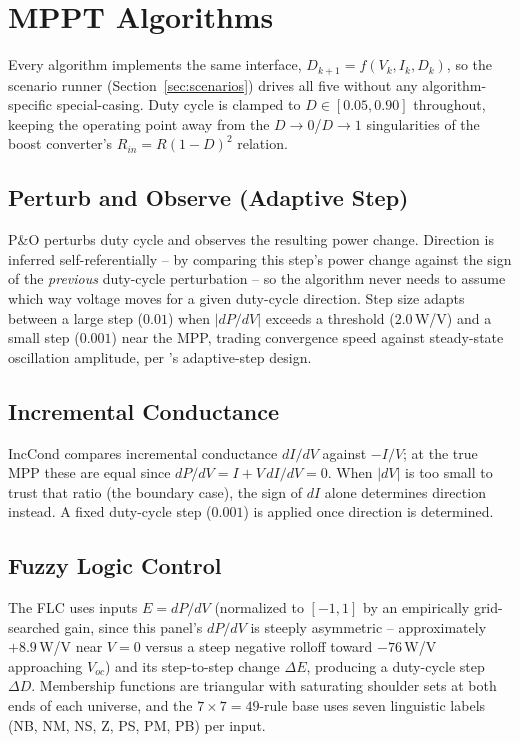 \section{MPPT Algorithms}
\label{sec:algorithms}

Every algorithm implements the same interface,
$D_{k+1} = f(V_k, I_k, D_k)$, so the scenario runner
(Section~\ref{sec:scenarios}) drives all five without any
algorithm-specific special-casing. Duty cycle is clamped to
$D\in[0.05,0.90]$ throughout, keeping the operating point away from the
$D\to0$/$D\to1$ singularities of the boost converter's
$R_{in}=R(1-D)^2$ relation.

\subsection{Perturb and Observe (Adaptive Step)}
P\&O \cite{femia2005optimization} perturbs duty cycle and observes the
resulting power change. Direction is inferred self-referentially -- by
comparing this step's power change against the sign of the \emph{previous}
duty-cycle perturbation -- so the algorithm never needs to assume which way
voltage moves for a given duty-cycle direction. Step size adapts between a
large step ($0.01$) when $|dP/dV|$ exceeds a threshold ($2.0\,$W/V) and a
small step ($0.001$) near the MPP, trading convergence speed against
steady-state oscillation amplitude, per \cite{femia2005optimization}'s
adaptive-step design.

\subsection{Incremental Conductance}
IncCond \cite{hussein1995maximum} compares incremental conductance
$dI/dV$ against $-I/V$; at the true MPP these are equal since
$dP/dV = I + V\,dI/dV = 0$. When $|dV|$ is too small to trust that ratio
(the boundary case), the sign of $dI$ alone determines direction instead.
A fixed duty-cycle step ($0.001$) is applied once direction is determined.

\subsection{Fuzzy Logic Control}
The FLC uses inputs $E=dP/dV$ (normalized to $[-1,1]$ by an empirically
grid-searched gain, since this panel's $dP/dV$ is steeply asymmetric --
approximately $+8.9\,$W/V near $V=0$ versus a steep negative rolloff toward
$-76\,$W/V approaching $V_{oc}$) and its step-to-step change $\Delta E$,
producing a duty-cycle step $\Delta D$. Membership functions are triangular
with saturating shoulder sets at both ends of each universe, and the
$7\times7=49$-rule base uses seven linguistic labels
(NB, NM, NS, Z, PS, PM, PB) per input.

